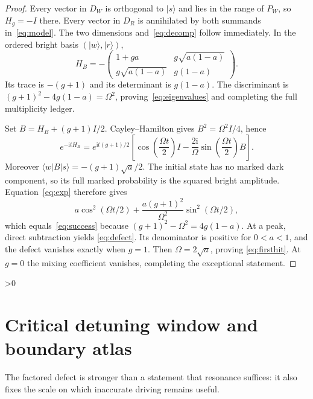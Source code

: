 \documentclass[10pt]{article}
\providecommand{\CRevisionRound}{2}
\newcommand{\ket}[1]{|#1\rangle}
\newcommand{\bra}[1]{\langle#1|}
\newcommand{\iu}{\mathrm{i}}
\begin{document}
\begin{proof}
Every vector in $D_W$ is orthogonal to $\ket s$ and lies in the range of
$P_W$, so $H_g=-I$ there.  Every vector in $D_R$ is annihilated by both
summands in~\eqref{eq:model}.  The two dimensions and~\eqref{eq:decomp}
follow immediately.  In the ordered bright basis $(\ket w,\ket r)$,
\begin{equation}\label{eq:brightmatrix}
 H_B=-\begin{pmatrix}
 1+ga&g\sqrt{a(1-a)}\\
 g\sqrt{a(1-a)}&g(1-a)
 \end{pmatrix}.
\end{equation}
Its trace is $-(g+1)$ and its determinant is $g(1-a)$.  The discriminant is
$(g+1)^2-4g(1-a)=\Omega^2$, proving~\eqref{eq:eigenvalues} and completing the
full multiplicity ledger.

Set $B=H_B+(g+1)I/2$.  Cayley--Hamilton gives
$B^2=\Omega^2I/4$, hence
\begin{equation}\label{eq:exp}
 e^{-\iu tH_B}=e^{\iu t(g+1)/2}
 \left[\cos\!\left(\frac{\Omega t}{2}\right)I
 -\frac{2\iu}{\Omega}\sin\!\left(\frac{\Omega t}{2}\right)B\right].
\end{equation}
Moreover $\bra wB\ket s=-(g+1)\sqrt a/2$.  The initial state has no marked
dark component, so its full marked probability is the squared bright
amplitude.  Equation~\eqref{eq:exp} therefore gives
\[
 a\cos^2(\Omega t/2)+\frac{a(g+1)^2}{\Omega^2}
 \sin^2(\Omega t/2),
\]
which equals~\eqref{eq:success} because
$(g+1)^2-\Omega^2=4g(1-a)$.  At a peak, direct subtraction yields
\eqref{eq:defect}.  Its denominator is positive for $0<a<1$, and the defect
vanishes exactly when $g=1$.  Then $\Omega=2\sqrt a$, proving
\eqref{eq:firsthit}.  At $g=0$ the mixing coefficient vanishes, completing
the exceptional statement.
\end{proof}

\ifnum\CRevisionRound>0
\section{Critical detuning window and boundary atlas}
The factored defect is stronger than a statement that resonance suffices: it
also fixes the scale on which inaccurate driving remains useful.
\end{document}
